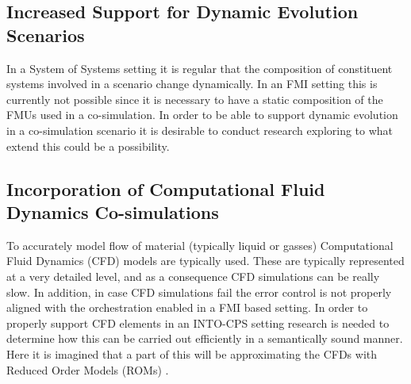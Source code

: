 
\subsection{Increased Support for Dynamic Evolution Scenarios}

In a System of Systems setting it is regular that the composition of constituent systems involved in a scenario change dynamically.
In an FMI setting this is currently not possible since it is necessary to have a static composition of the FMUs used in a co-simulation. In order to be able to support dynamic evolution in a co-simulation scenario it is desirable to conduct research exploring to what extend this could be a possibility.


\subsection{Incorporation of Computational Fluid Dynamics Co-simulations}

To accurately model flow of material (typically liquid or gasses) Computational Fluid Dynamics (CFD) models are typically used. These are typically represented at a very detailed level, and as a consequence CFD simulations can be really slow. In addition, in case CFD simulations fail the error control is not properly aligned with the orchestration enabled in a FMI based setting. In order to properly support CFD elements in an INTO-CPS setting research is needed to determine how this can be carried out efficiently in a semantically sound manner. Here it is imagined that a part of this will be approximating the CFDs with Reduced Order Models (ROMs) \cite{Carlberg&13}.


